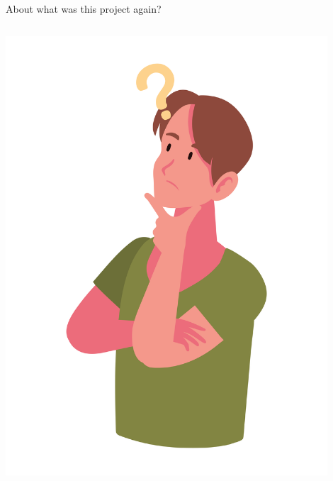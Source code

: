 \documentclass[
ngerman,%
authorontitle=true,
]{bfhbeamer}
\begin{document}
	\begin{frame}{About what was this project again?}
		
		\begin{columns} %
			\begin{column}{0.3\textwidth} %
				\begin{center}
					\includegraphics[width=0.9\textwidth]{pictures/final_presentation/thinking1.jpg}
				\end{center}
			\end{column}
		\end{columns}
	\end{frame}
	
\end{document}
